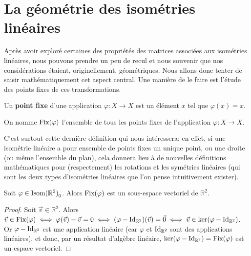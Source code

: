 \documentclass{book}
\numberwithin{equation}{section}
\renewcommand{\phi}{\varphi}
\providecommand{\plan}{{\mathbb R^2}}
\providecommand{\origin}{{\vec 0}}
\providecommand{\id}{{\textnormal{Id}}}
\providecommand{\IdR}{{\id_\plan}}
\providecommand{\isom}{{\textnormal{Isom}(\plan)}}
\providecommand{\isomo}{{\isom_0}}
\providecommand{\ker}{{\textnormal{ker}}}
\providecommand{\Fix}{{\textnormal{Fix}}}
\begin{document}
\section{La géométrie des isométries linéaires}
Après avoir exploré certaines des propriétés des matrices associées aux isométries linéaires, nous pouvons prendre un peu de recul et nous souvenir que nos considérations étaient, originellement, géométriques. Nous allons donc tenter de saisir mathématiquement cet aspect central. Une manière de le faire est l'étude des points fixes de ces transformations.

\begin{defn}
	Un \textbf{point fixe} d'une application $\phi : X \to X$ est un élément $x$ tel que $\phi(x) = x$.
\end{defn}

\begin{defn}
	On nomme $\Fix(\phi)$ l'ensemble de tous les points fixes de l'application $\phi : X \to X$.
\end{defn}

C'est surtout cette dernière définition qui nous intéressera: en effet, si une isométrie linéaire a pour ensemble de points fixes un unique point, ou une droite (ou même l'ensemble du plan), cela donnera lieu à de nouvelles définitions mathématiques pour (respectement) les rotations et les symétries linéaires (qui sont les deux types d'isométries linéaires que l'on pense intuitivement exister).

\begin{prop}
	Soit $\phi \in \isomo$. Alors $\Fix(\phi)$ est un sous-espace vectoriel de $\plan$.
\end{prop}
\begin{proof}
	Soit $\vec v \in \plan$. Alors $\vec v \in \Fix(\phi) \iff \phi(\vec v) - \vec v = 0 \iff (\phi-\IdR)(\vec v) = \origin \iff \vec v \in \ker(\phi - \IdR)$. Or $\phi - \IdR$ est une application linéaire (car $\phi$ et $\IdR$ sont des applications linéaires), et donc, par un résultat d'algèbre linéaire, $\ker(\phi - \IdR) = \Fix(\phi)$ est un espace vectoriel.
\end{proof}
\end{document}
